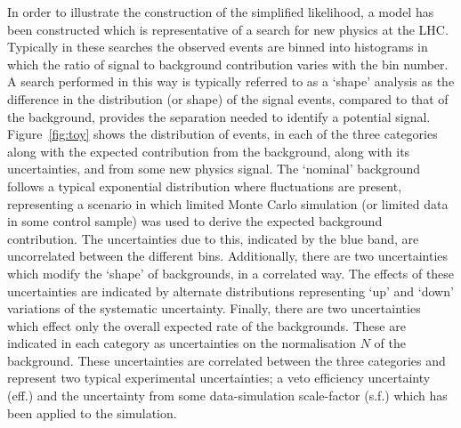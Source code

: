 \documentclass[11pt]{article}
\begin{document}
In order to illustrate the construction of the simplified likelihood, a model has been constructed which is representative of a search for new physics at the LHC. Typically in these searches the observed events are binned into histograms in which the ratio of signal to background contribution varies with the bin number. A search performed in this way is typically referred to as a `shape' analysis as the difference in the distribution (or shape) of the signal events, compared to that of the background, provides the separation needed to identify a potential signal.
Figure~\ref{fig:toy} shows the distribution of events, in each of the three categories along with the expected contribution from the background, along with its uncertainties, and from some new physics signal.
The `nominal' background follows a typical exponential distribution where fluctuations are present, representing a scenario in which limited Monte Carlo simulation (or limited data in some control sample) was used
to derive the expected background contribution. The uncertainties due to this, indicated by the blue band, are uncorrelated between the different bins. Additionally, there are two uncertainties which modify the `shape' of
backgrounds, in a correlated way. The effects of these uncertainties are indicated by alternate distributions representing `up' and `down' variations of the systematic uncertainty. Finally, there are two uncertainties
which effect only the overall expected rate of the backgrounds. These are indicated in each category as uncertainties on the normalisation $N$ of the background. These uncertainties are correlated between the three categories
and represent two typical experimental uncertainties; a veto efficiency uncertainty (eff.) and the uncertainty from some data-simulation scale-factor (s.f.) which has been applied to the simulation.
\end{document}
